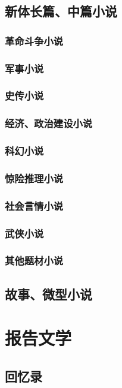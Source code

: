 \documentclass[UTF8]{../../RepresentationUniverse}
\begin{document}
    \subsection{新体长篇、中篇小说}
        \subsubsection{革命斗争小说}
        \subsubsection{军事小说}
        \subsubsection{史传小说}
        \subsubsection{经济、政治建设小说}
        \subsubsection{科幻小说}
        \subsubsection{惊险推理小说}
        \subsubsection{社会言情小说}
        \subsubsection{武侠小说}
        \subsubsection{其他题材小说}
    \subsection{故事、微型小说}






\section{报告文学}
    \subsection{回忆录}
\end{document}
